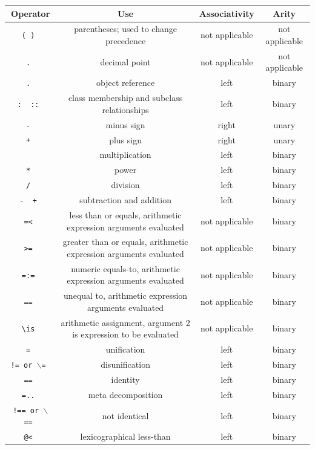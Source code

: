 \documentclass[11pt]{article}
\newcommand{\bs}{\textbackslash}
\newcommand{\bksl}{\symbol{92}}
\begin{document}
\begin{table}[htb]
  \center
{ \footnotesize
\begin{tabular}{|c|c|c|c|}
\hline
 Operator & Use & Associativity & Arity \\ \hline
 \tt(~) & parentheses; used to change precedence & not applicable & not applicable\\ \hline
\tt . & decimal point & not applicable & not applicable \\ \hline
\tt .   & object reference & left & binary \\ \cline{1-4}
 \tt :~ ::    & class membership and subclass relationships & left & binary \\ \cline{1-4}
 \tt - & minus sign & right & unary \\ \cline{1-4}
 \tt + & plus sign & right & unary \\ \hline
 \tt * & multiplication & left & binary \\ \cline{1-4}
 \tt ** & power & left & binary \\ \cline{1-4}
 \tt / & division & left & binary \\ \hline
 \tt- ~+ & subtraction and addition & left & binary \\ \cline{1-4}
\tt =< & less than or equals, arithmetic expression arguments evaluated & not applicable & binary \\ \cline{1-4}
\tt >= & greater than or equals, arithmetic expression arguments evaluated & not applicable & binary \\ \cline{1-4}
\tt =:= & numeric equals-to, arithmetic expression arguments evaluated & not applicable & binary \\ \cline{1-4}
\tt ={\bksl}= & unequal to, arithmetic expression arguments evaluated & not applicable & binary \\ \cline{1-4}
\tt \bs{}is & arithmetic assignment, argument 2 is expression to be
            evaluated & not applicable & binary \\ \cline{1-4}
\tt = & unification & left & binary \\ \cline{1-4}
\tt != or $\backslash$= & disunification & left & binary \\ \cline{1-4}
\tt == & identity & left & binary \\ \cline{1-4}
\tt =.. & meta decomposition & left & binary \\  \cline{1-4}
\tt !== or \texttt{$\backslash$==} & not identical & left & binary \\ \cline{1-4}
\tt @< & lexicographical less-than & left & binary \\  \cline{1-4}

\end{tabular}}
\end{table}
\end{document}

